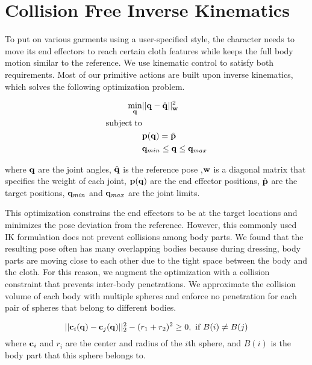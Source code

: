 \section{Collision Free Inverse Kinematics}

To put on various garments using a user-specified style, the character needs to move its end effectors to reach certain cloth features while keeps the full body motion similar to the reference. We use kinematic control to satisfy both requirements. Most of our primitive actions are built upon inverse kinematics, which solves the following optimization problem.

\begin{align}
\label{eq:IK}
  \min_{\mathbf{q}} & ||\mathbf{q} - \hat{\mathbf{q}}||_{\mathbf{w}}^2 \\
  \nonumber  \mathrm{subject\;} \mathrm{to} & \\
  \nonumber  &\mathbf{p}(\mathbf{q}) = \hat{\mathbf{p}}\\
\nonumber   &\mathbf{q}_{min} \leq \mathbf{q} \leq \mathbf{q}_{max}
\end{align}

where $\mathbf{q}$ are the joint angles, $\hat{\mathbf{q}}$ is the reference pose ,$\mathbf{w}$ is a diagonal matrix that specifies the weight of each joint, $\mathbf{p}(\mathbf{q})$ are the end effector positions, $\hat{\mathbf{p}}$ are the target positions, $\mathbf{q}_{min}$ and $\mathbf{q}_{max}$ are the joint limits.

This optimization constrains the end effectors to be at the target locations and minimizes the pose deviation from the reference. However, this commonly used IK formulation does not prevent collisions among body parts. We found that the resulting pose often has many overlapping bodies because during dressing, body parts are moving close to each other due to the tight space between the body and the cloth. For this reason, we augment the optimization with a collision constraint that prevents inter-body penetrations. We approximate the collision volume of each body with multiple spheres and enforce no penetration for each pair of spheres that belong to different bodies.

\begin{equation}
  ||\mathbf{c}_i(\mathbf{q}) - \mathbf{c}_j(\mathbf{q})||_2^2 - (r_1 + r_2)^2 \geq 0,\mbox{ if }B(i) \neq B(j)
  \label{eq:collision}
\end{equation}
where $\mathbf{c}_i$ and $r_i$ are the center and radius of the $i$th sphere, and $B(i)$ is the body part that this sphere belongs to.
